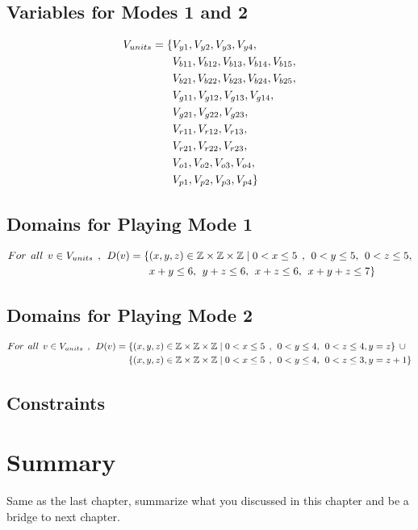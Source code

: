 \subsection{Variables for Modes 1 and 2}
\begin{align*}
V_{units}=\{&V_{y1},V_{y2},V_{y3},V_{y4},\\&V_{b11},V_{b12},V_{b13},V_{b14},
V_{b15},\\&V_{b21},V_{b22},V_{b23},V_{b24},V_{b25},\\&V_{g11},V_{g12},V_{g13},V_{g14},\\&V_{g21},V_{g22},V_{g23},\\&V_{r11},
V_{r12},V_{r13},\\&V_{r21},V_{r22},V_{r23},\\&V_{o1},V_{o2},V_{o3},V_{o4},\\&V_{p1},V_{p2},V_{p3},V_{p4}\}
\end{align*}
\subsection{Domains for Playing Mode 1}
\begin{align*}
For \hspace{1ex} all \hspace{1ex} v \in V_{units} \hspace{1ex},\hspace{1ex} D(v)=\{&(x,y,z) \in \mathbb{Z} \times \mathbb{Z}	\times \mathbb{Z} \mid  0<x \leq 5 \hspace{1ex} , \hspace{1ex} 0<y \leq 5,\hspace{1ex} 0<z \leq 5,\\& x+y\leq 6,\hspace{1ex} y+z\leq 6,\hspace{1ex}x+z\leq 6,\hspace{1ex}x+y+z\leq 7\}
\end{align*}
\subsection{Domains for Playing Mode 2}
\begin{align*}
For \hspace{1ex} all \hspace{1ex} v \in V_{units} \hspace{1ex},\hspace{1ex} D(v)=\{&(x,y,z) \in \mathbb{Z} \times \mathbb{Z}	\times \mathbb{Z} \mid  0<x \leq 5 \hspace{1ex} , \hspace{1ex} 0<y \leq 4,\hspace{1ex} 0<z \leq 4,y=z\} \hspace{1ex}\cup\\
\{&(x,y,z) \in \mathbb{Z} \times \mathbb{Z}	\times \mathbb{Z} \mid  0<x \leq 5 \hspace{1ex} , \hspace{1ex} 0<y \leq 4,\hspace{1ex} 0<z \leq 3,y=z+1\}
\end{align*}
\subsection{Constraints}
\section{Summary}
Same as the last chapter, summarize what you discussed in this chapter and
be a bridge to next chapter.
